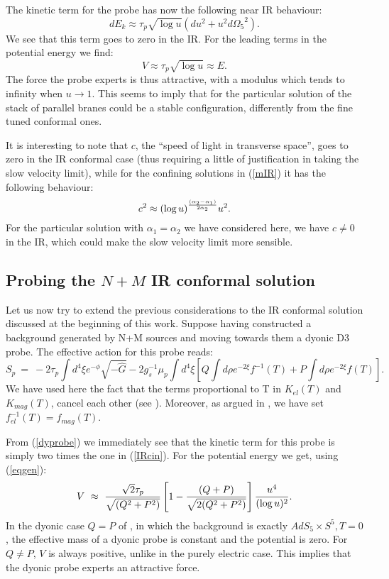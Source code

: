 \documentclass[a4paper,12pt]{article}
\begin{document}
The kinetic term for the probe has now the following near IR behaviour:
\begin{equation}
dE_k\approx \tau_p {\sqrt{\log u}}\left(du^2 + u^2 d{\Omega_5}^2\right).
\end{equation}
We see that this term goes to zero in the IR.
For the leading terms in the potential energy we find:
\begin{equation}
V\approx \tau_p \sqrt{\log u}\approx E.
\end{equation}
The force the probe experts is thus attractive, with a modulus which tends
to infinity when $u\rightarrow 1$. This seems to imply that for the particular solution of \cite{minahan} the stack of parallel branes could be a stable
configuration, differently from the fine tuned conformal ones.

It is interesting to note that $c$, the ``speed of light in transverse space'', goes to
zero in the IR conformal case (thus requiring a little of justification in taking the
 slow velocity limit), while for the confining solutions in (\ref{mIR}) it has the following behaviour:
\begin{equation}  
c^2\approx (\log u)^{(\alpha_2-\alpha_1)\over 2\alpha_2}u^2.
\end{equation}
For the particular solution with $\alpha_1=\alpha_2$ we have considered here, we have
$c\neq 0$ in the IR, which could make the slow velocity limit more sensible.


\subsection{Probing the $N+M$ IR conformal solution}
Let us now try to extend the previous considerations to the IR conformal solution discussed at the beginning of this work. Suppose having constructed a background generated by N+M sources and moving towards them a dyonic D3 probe. The effective action for this probe reads:
\begin{equation}
S_p~=~ -2\tau_p \int d^4\xi e^{-\phi}\sqrt{-\hat{G}} -2g^{-1}_s\mu_p\int d^4\xi\left[ Q \int d\rho e^{-2\xi}f^{-1}(T) + P \int d\rho e^{-2\xi}f(T)\right].
\label{dyprobe}
\end{equation}
We have used here the fact that the terms proportional to T in $K_{el}(T)$ and $K_{mag}(T)$, cancel each other (see \cite{kt1}). Moreover, as argued in \cite{kt1}, we have set $f^{-1}_{el}(T) = f_{mag}(T)$.

From (\ref{dyprobe}) we immediately see that the kinetic term for this probe is
simply two times the one in (\ref{IRcin}). For the potential energy we get, 
using (\ref{eqgen}):
\begin{equation}
V~\approx~ {{\sqrt {2}\tau_p}\over{\sqrt {(Q^2 + P^2)}}}\left[ 1- {(Q+ P)\over{\sqrt{2(Q^2 + P^2)}}}\right]{u^4\over(\log u)^2} .
\end{equation}
In the dyonic case $Q=P$ of \cite{kt1}, in which the background is exactly $AdS_5\times S^5, T=0$, the effective mass of a dyonic probe is constant and the potential is zero. For $Q\neq P$, $V$ is always positive, unlike in the purely electric case. This implies that the dyonic probe experts an attractive 
force. 
\end{document}

